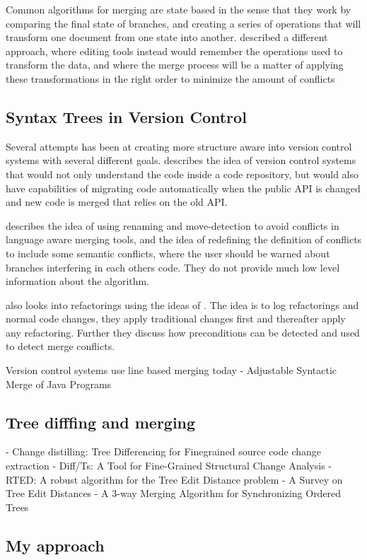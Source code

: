 \documentclass[12pt]{article}
\begin{document}
Common algorithms for merging are state based in the sense that they work by comparing the final state of branches, and creating a series of operations that will transform one document from one state into another. \citet{Lippe} described a different approach, where editing tools instead would remember the operations used to transform the data, and where the merge process will be a matter of applying these transformations in the right order to minimize the amount of conflicts

\subsection{Syntax Trees in Version Control}
Several attempts has been at creating more structure aware into version control systems with several different goals. \citet{Freese} describes the idea of version control systems that would not only understand the code inside a code repository, but would also have capabilities of migrating code automatically when the public API is changed and new code is merged that relies on the old API. 


\citet{Hunt} describes the idea of using renaming and move-detection to avoid conflicts in language aware merging tools, and the idea of redefining the definition of conflicts to include some semantic conflicts, where the user should be warned about branches interfering in each others code. They do not provide much low level information about the algorithm.

\citet{Ekman} also looks into refactorings using the ideas of \citet{Lippe}. The idea is to log refactorings and normal code changes, they apply traditional changes first and thereafter apply any refactoring. Further they discuss how preconditions can be detected and used to detect merge conflicts.


Version control systems use line based merging today
- Adjustable Syntactic Merge of Java Programs


\subsection{Tree difffing and merging}
- Change distilling: Tree Differencing for Finegrained source code change extraction
- Diff/Ts: A Tool for Fine-Grained Structural Change Analysis
- RTED: A robust algorithm for the Tree Edit Distance problem
- A Survey on Tree Edit Distances
- A 3-way Merging Algorithm for Synchronizing Ordered Trees

\subsection{My approach}
\end{document}
